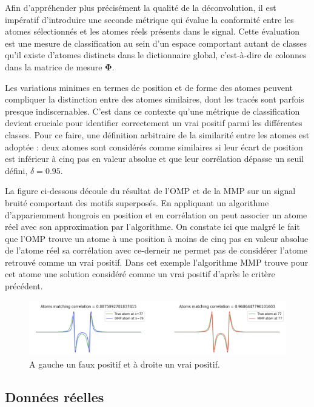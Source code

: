 \documentclass[9pt,a4paper,twoside]{rho}
\begin{document}
Afin d'appréhender plus précisément la qualité de la déconvolution, il est impératif d'introduire une seconde métrique qui évalue la conformité entre les atomes sélectionnés et les atomes réels présents dans le signal. 
Cette évaluation est une mesure de classification au sein d'un espace comportant autant de classes qu'il existe d'atomes distincts dans le dictionnaire global, c'est-à-dire de colonnes dans la matrice de mesure $\mathbf{\Phi}$.

Les variations minimes en termes de position et de forme des atomes peuvent compliquer la distinction entre des atomes similaires, dont les tracés sont parfois presque indiscernables. 
C'est dans ce contexte qu'une métrique de classification devient cruciale pour identifier correctement un vrai positif parmi les différentes classes. 
Pour ce faire, une définition arbitraire de la similarité entre les atomes est adoptée : deux atomes sont considérés comme similaires si leur écart de position est inférieur à cinq pas en valeur absolue et que leur corrélation dépasse un seuil défini, $\delta=0.95$.

La figure ci-dessous découle du résultat de l'OMP et de la MMP sur un signal bruité comportant des motifs superposés. En appliquant un algorithme d'appariemment hongrois en position et en corrélation on peut associer un atome réel avec son approximation par l'algorithme. On constate ici que malgré le fait que l'OMP trouve un atome à une position à moins de cinq pas en valeur absolue de l'atome réel sa corrélation avec ce-derneir ne permet pas de considérer l'atome retrouvé comme un vrai positif. 
Dans cet exemple l'algorithme MMP trouve pour cet atome une solution considéré comme un vrai positif d'après le critère précédent.

\begin{figure}[H]
    \centering
    \includegraphics[width=\linewidth]{images/atom_matching.png}
    \caption{A gauche un faux positif et à droite un vrai positif.}
    \label{fig:atom_matching}
\end{figure}

\subsection{Données réelles}
\end{document}
